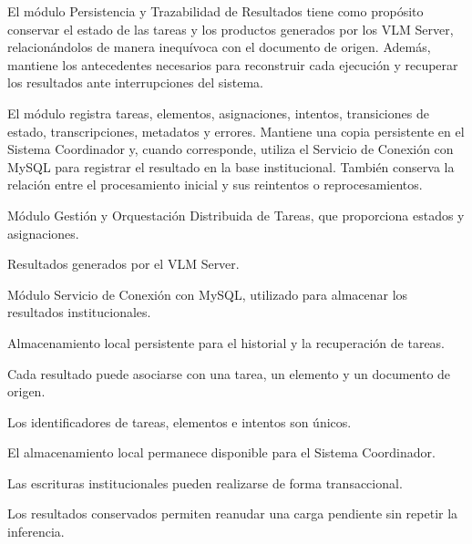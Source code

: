 \begin{definicionmodulo}

\item[Propósito] El módulo Persistencia y Trazabilidad de Resultados tiene como propósito conservar el estado de las tareas y los productos generados por los VLM Server, relacionándolos de manera inequívoca con el documento de origen. Además, mantiene los antecedentes necesarios para reconstruir cada ejecución y recuperar los resultados ante interrupciones del sistema.

\item[Alcance] El módulo registra tareas, elementos, asignaciones, intentos, transiciones de estado, transcripciones, metadatos y errores. Mantiene una copia persistente en el Sistema Coordinador y, cuando corresponde, utiliza el Servicio de Conexión con MySQL para registrar el resultado en la base institucional. También conserva la relación entre el procesamiento inicial y sus reintentos o reprocesamientos.

\item[Dependencias]
\begin{elementosmodulo}
    \item Módulo Gestión y Orquestación Distribuida de Tareas, que proporciona estados y asignaciones.
    \item Resultados generados por el VLM Server.
    \item Módulo Servicio de Conexión con MySQL, utilizado para almacenar los resultados institucionales.
    \item Almacenamiento local persistente para el historial y la recuperación de tareas.
\end{elementosmodulo}

\item[Supuestos]
\begin{elementosmodulo}
    \item Cada resultado puede asociarse con una tarea, un elemento y un documento de origen.
    \item Los identificadores de tareas, elementos e intentos son únicos.
    \item El almacenamiento local permanece disponible para el Sistema Coordinador.
    \item Las escrituras institucionales pueden realizarse de forma transaccional.
    \item Los resultados conservados permiten reanudar una carga pendiente sin repetir la inferencia.
\end{elementosmodulo}


\end{definicionmodulo}
